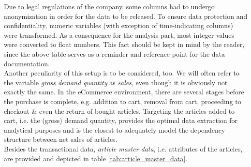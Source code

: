 Due to legal regulations of the company, some columns had to undergo anonymization in order for the data to be released. To ensure data protection and confidentiality, numeric variables (with exception of time-indicating columns) were transformed. As a consequence for the analysis part, most integer values were converted to float numbers. This fact should be kept in mind by the reader, since the above table serves as a reminder and reference point for the data documentation.\\

Another peculiarity of this setup is to be considered, too. We will often refer to the variable \textit{gross demand quantity} as \textit{sales}, even though it is obviously not exactly the same. In the eCommerce environment, there are several stages before the purchase is complete, e.g. addition to cart, removal from cart, proceeding to checkout \& even the return of bought articles. Targeting the articles added to cart, i.e. the (gross) demand quantity, provides the optimal data extraction for analytical purposes and is the closest to adequately model the dependency structure between net sales of articles.\\

Besides the transactional data, \textit{article master data}, i.e. attributes of the articles, are provided and depicted in table \ref{tab:article_master_data}.


